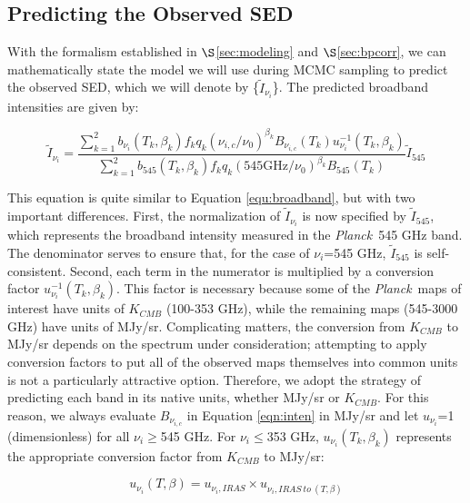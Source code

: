 \documentclass{emulateapj}
\newcommand{\IRAS}{{\it IRAS}}
\newcommand{\PLANCK}{{\it Planck}}
\begin{document}

\subsection{Predicting the Observed SED}
With the formalism established in $\S$\ref{sec:modeling} and 
$\S$\ref{sec:bpcorr}, we can mathematically state the model we will use during 
MCMC sampling to predict the observed SED, which we will denote by 
\{$\tilde{I}_{\nu_i}$\}. The predicted broadband intensities are given by:

\begin{equation}
\label{eqn:inten}
\tilde{I}_{\nu_i} = \frac{\sum\limits_{k=1}^{2} b_{\nu_i}(T_k, \beta_k) f_k q_k (\nu_{i,c}/\nu_0)^{\beta_k} B_{\nu_{i,c}}(T_k) u_{\nu_i}^{-1}(T_k, \beta_k)}{\sum\limits_{k=1}^{2} b_{545}(T_k, \beta_k) f_k q_k (545 \textrm{GHz}/\nu_0)^{\beta_k} B_{545}(T_k)}\tilde{I}_{545}
\end{equation}

This equation is quite similar to Equation \ref{equ:broadband}, but with two 
important differences. First, the normalization of $\tilde{I}_{\nu_i}$ is now 
specified by $\tilde{I}_{545}$, which represents the broadband intensity 
measured in the \PLANCK~545 GHz band. The denominator serves to ensure that,
for the case of $\nu_i$=545 GHz, $\tilde{I}_{545}$ is self-consistent. Second, 
each term in the numerator is multiplied by a conversion factor 
$u_{\nu_i}^{-1}(T_k, \beta_k)$. This factor is necessary because some of the 
\PLANCK~maps of interest have units of $K_{CMB}$ (100-353 GHz), while the
remaining maps (545-3000 GHz) have units of MJy/sr. Complicating matters, the 
conversion from $K_{CMB}$ to MJy/sr depends on the spectrum under 
consideration; attempting to apply conversion factors to put all of the 
observed maps themselves into common units is not a particularly attractive 
option. Therefore, we adopt the strategy of predicting each band in its native 
units, whether MJy/sr or $K_{CMB}$. For this reason, we always evaluate 
$B_{\nu_{i,c}}$ in Equation \ref{eqn:inten} in MJy/sr and let $u_{\nu_i}$=1 
(dimensionless) for all $\nu_i$$\ge$545 GHz. For $\nu_i$$\le$353 GHz, 
$u_{\nu_i}(T_k, \beta_k)$ represents the appropriate conversion factor from 
$K_{CMB}$ to MJy/sr:


\begin{equation}
u_{\nu_i}(T, \beta) = u_{\nu_i, IRAS} \times u_{\nu_i, IRAS \ to \ (T, \beta)}
\end{equation}
\end{document}
